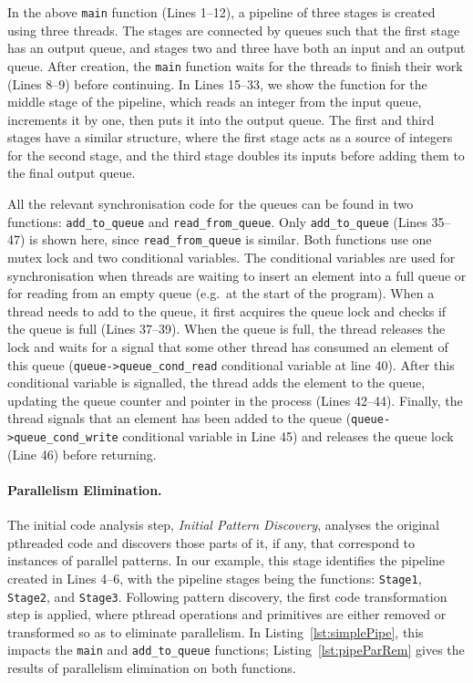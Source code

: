 \noindent
In the above \lstinline|main| function (Lines 1--12), a pipeline of three stages is created using three threads. The stages are connected by queues such that the first stage has an output queue, and stages two and three have both an input and an output queue. After creation, the \lstinline|main| function waits for the threads to finish their work (Lines 8--9) before continuing. In Lines 15--33, we show the function for the middle stage of the pipeline, which reads an integer from the input queue, increments it by one, then puts it into the output queue. The first and third stages have a similar structure, where the first stage acts as a source of integers for the second stage, and the third stage doubles its inputs before adding them to the final output queue.

All the relevant synchronisation code for the queues can be found in two functions: \lstinline{add_to_queue} and \lstinline{read_from_queue}. Only \lstinline{add_to_queue} (Lines 35--47) is shown here, since \lstinline{read_from_queue} is similar. Both functions use one mutex lock and two conditional variables. The conditional variables are used for synchronisation when threads are waiting to insert an element into a full queue or for reading from an empty queue (e.g.\ at the start of the program). When a thread needs to add to the queue, it first acquires the queue lock and checks if the queue is full (Lines 37--39).
When the queue is full, the thread releases the lock and waits for a signal that some other thread has consumed an element of this queue (\lstinline{queue->queue_cond_read} conditional variable at line 40). After this conditional variable is signalled, the thread adds the element to the queue, updating the queue counter and pointer in the process (Lines 42--44). Finally, the thread signals that an element has been added to the queue (\lstinline{queue->queue_cond_write} conditional variable in Line 45) and releases the queue lock (Line 46) before returning.

\paragraph{Parallelism Elimination.}
The initial code analysis step, \emph{Initial Pattern Discovery}, analyses the original pthreaded code and discovers those parts of it, if any, that correspond to instances of parallel patterns. In our example, this stage identifies the pipeline created in Lines 4--6, with the pipeline stages being the functions: \lstinline{Stage1}, \lstinline{Stage2}, and \lstinline{Stage3}. 
Following pattern discovery, the first code transformation step is applied, where pthread operations and primitives are either removed or transformed so as to eliminate parallelism.
In Listing~\ref{lst:simplePipe}, this impacts the \lstinline|main| and \lstinline|add_to_queue| functions; Listing~\ref{lst:pipeParRem} gives the results of parallelism elimination on both functions.

